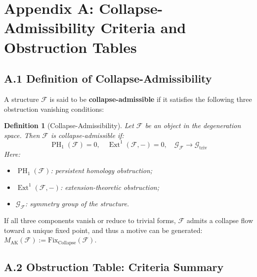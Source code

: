 \documentclass[11pt]{article}
\newtheorem{definition}[theorem]{Definition}
\DeclareMathOperator{\Ext}{Ext}
\DeclareMathOperator{\PH}{PH}
\begin{document}
\FloatBarrier



\appendix
\section*{Appendix A: Collapse-Admissibility Criteria and Obstruction Tables}

\subsection*{A.1 Definition of Collapse-Admissibility}

A structure $\mathcal{F}$ is said to be \textbf{collapse-admissible} if it satisfies the following three obstruction vanishing conditions:

\begin{definition}[Collapse-Admissibility]
Let $\mathcal{F}$ be an object in the degeneration space. Then $\mathcal{F}$ is collapse-admissible if:
\[
\PH_1(\mathcal{F}) = 0, \quad \Ext^1(\mathcal{F}, -) = 0, \quad \mathcal{G}_{\mathcal{F}} \longrightarrow \mathcal{G}_{\mathrm{triv}}
\]
Here:
\begin{itemize}
    \item $\PH_1(\mathcal{F})$: persistent homology obstruction;
    \item $\Ext^1(\mathcal{F}, -)$: extension-theoretic obstruction;
    \item $\mathcal{G}_{\mathcal{F}}$: symmetry group of the structure.
\end{itemize}
\end{definition}

If all three components vanish or reduce to trivial forms, $\mathcal{F}$ admits a collapse flow toward a unique fixed point, and thus a motive can be generated: $M_{\mathrm{AK}}(\mathcal{F}) := \mathrm{Fix}_{\mathrm{Collapse}}(\mathcal{F})$.

\subsection*{A.2 Obstruction Table: Criteria Summary}
\end{document}
